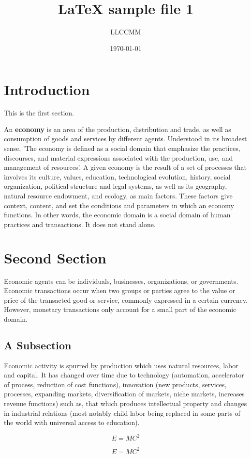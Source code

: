 \documentclass[12pt]{article}
\begin{document}
\title{LaTeX sample file 1}
\author{LLCCMM}
\date{\today}

\maketitle

\section{Introduction}

This is the first section.

An \textbf{economy} is an area of the production, distribution and trade, as well as consumption of goods and services by different agents. Understood in its broadest sense, 'The economy is defined as a social domain that emphasize the practices, discourses, and material expressions associated with the production, use, and management of resources'. A given economy is the result of a set of processes that involves its culture, values, education, technological evolution, history, social organization, political structure and legal systems, as well as its geography, natural resource endowment, and ecology, as main factors. These factors give context, content, and set the conditions and parameters in which an economy functions. In other words, the economic domain is a social domain of human practices and transactions. It does not stand alone.

\section{Second Section}

{\Large Economic agents can be individuals, businesses, organizations, or governments. Economic transactions occur when two groups or parties agree to the value or price of the transacted good or service, commonly expressed in a certain currency. However, monetary transactions only account for a small part of the economic domain.}

\subsection{A Subsection}

 Economic activity is spurred by production which uses natural resources, labor and capital. It has changed over time due to technology (automation, accelerator of process, reduction of cost functions), innovation (new products, services, processes, expanding markets, diversification of markets, niche markets, increases revenue functions) such as, that which produces intellectual property and changes in industrial relations (most notably child labor being replaced in some parts of the world with universal access to education).

\begin{equation}
E = MC^{2}
\end{equation}

\begin{equation*}
E = MC^{2}
\end{equation*}
\end{document}

